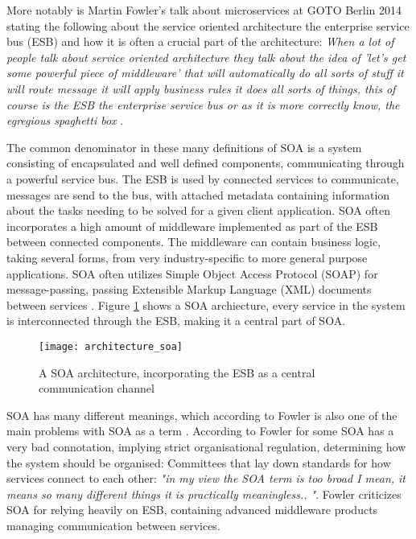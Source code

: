 More notably is Martin Fowler's talk about microservices at GOTO Berlin 2014 stating the following about the service oriented architecture the enterprise service bus (ESB) and how it is often a crucial part of the architecture:
\textit{When a lot of people talk about service oriented architecture they talk about the idea of 'let's get some powerful piece of middleware' that will automatically do all sorts of stuff it will route message it will apply business rules it does all sorts of things, this of course is the ESB the enterprise service bus or as it is more correctly know, the egregious spaghetti box} \cite[t.8.15]{fowler2014microservicesoamonolith}.

The common denominator in these many definitions of SOA is a system consisting of encapsulated and well defined components, communicating through a powerful service bus. The ESB is used by connected services to communicate, messages are send to the bus, with attached metadata containing information about the tasks needing to be solved for a given client application. SOA often incorporates a high amount of middleware implemented as part of the ESB between connected components. The middleware can contain business logic, taking several forms, from very industry-specific to more general purpose applications. SOA often utilizes Simple Object Access Protocol (SOAP) for message-passing, passing Extensible Markup Language (XML) documents between services \cite[p.~272]{sosinsky2010cloud}. Figure \ref{fig:architecture_soa} shows a SOA archiecture, every service in the system is interconnected through the ESB, making it a central part of SOA.

\begin{figure}[!htb]
\begin{center} 
  \texttt{[image: architecture\_soa]}  
  \caption{A SOA architecture, incorporating the ESB as a central communication channel}
  \label{fig:architecture_soa}
  \end{center}
\end{figure}

SOA has many different meanings, which according to Fowler is also one of the main problems with SOA as a term \cite[t.13:12]{fowler2014microservicesoamonolith}. According to Fowler for some SOA has a very bad connotation, implying strict organisational regulation, determining how the system should be organised: Committees that lay down standards for how services connect to each other: \textit{"in my view the SOA term is too broad I mean, it means so many different things it is practically meaningless.. "}\cite[t.14:00]{fowler2014microservicesoamonolith}. Fowler criticizes SOA for relying heavily on ESB, containing advanced middleware products managing communication between services.

